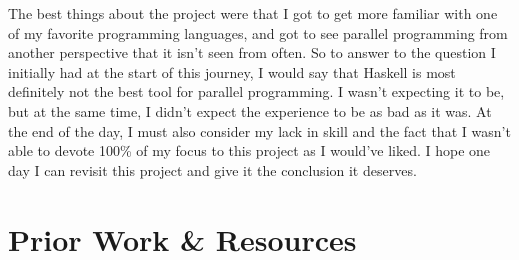 \documentclass[a4paper, 10pt]{article}
\begin{document}
The best things about the project were that I got to get more familiar with one of my favorite programming languages, and got to see parallel programming from another perspective that it isn't seen from often.
So to answer to the question I initially had at the start of this journey, I would say that Haskell is most definitely not the best tool for parallel programming. I wasn't expecting it to be, but at the same time, I didn't expect the experience to be as bad as it was. At the end of the day, I must also consider my lack in skill and the fact that I wasn't able to devote 100\% of my focus to this project as I would've liked. I hope one day I can revisit this project and give it the conclusion it deserves.


\section{Prior Work \& Resources}
\end{document}
